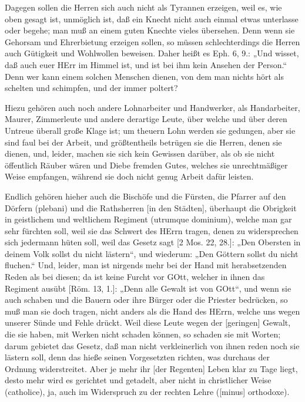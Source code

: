 Dagegen sollen die Herren sich auch nicht als Tyrannen erzeigen, weil es, wie oben gesagt ist, unmöglich ist, daß ein Knecht nicht auch einmal etwas unterlasse oder begehe; man muß an einem guten Knechte vieles übersehen. Denn wenn sie Gehorsam und Ehrerbietung erzeigen sollen, so müssen schlechterdings die Herren auch Gütigkeit und Wohlwollen beweisen. Daher heißt es Eph. 6, 9.: „Und wisset, daß auch euer HErr im Himmel ist, und ist bei ihm kein Ansehen der Person.“ Denn wer kann einem solchen Menschen dienen, von dem man nichts hört als schelten und schimpfen, und der immer poltert?

Hiezu gehören auch noch andere Lohnarbeiter
und Handwerker, als Handarbeiter, Maurer, Zimmerleute und andere derartige Leute, über welche und über deren Untreue überall große Klage ist; um theuern Lohn werden sie gedungen, aber sie sind faul bei der Arbeit, und größtentheils betrügen sie die Herren, denen sie dienen, und, leider, machen sie sich kein Gewissen darüber, als ob sie nicht öffentlich Räuber wären und Diebe fremden Gutes, welches sie unrechtmäßiger Weise empfangen, während sie doch nicht genug Arbeit dafür leisten.

Endlich gehören hieher auch die Bischöfe und die Fürsten, die Pfarrer auf den Dörfern (plebani) und die Rathsherren [in den Städten], überhaupt die Obrigkeit in geistlichem und weltlichem Regiment (utrumque dominium), welche man gar sehr fürchten soll, weil sie das Schwert des HErrn tragen, denen zu widersprechen sich jedermann hüten soll, weil das Gesetz sagt [2 Mos. 22, 28.]: „Den Obersten in deinem Volk sollst du nicht lästern“, und wiederum: „Den Göttern sollst du nicht fluchen.“ Und, leider, man ist nirgends mehr bei der Hand mit herabsetzenden Reden als bei diesen; da ist keine Furcht vor GOtt, welcher in ihnen das Regiment ausübt [Röm. 13, 1.]: „Denn alle Gewalt ist von GOtt“, und wenn sie auch schaben und die Bauern oder ihre Bürger oder die Priester bedrücken, so muß man sie doch tragen, nicht anders als die Hand des HErrn, welche uns wegen unserer Sünde und Fehle drückt. Weil diese Leute wegen der [geringen] Gewalt, die sie haben, mit Werken nicht schaden können, so schaden sie mit Worten; darum gebietet das Gesetz, daß man nicht verkleinerlich von ihnen reden noch sie lästern soll, denn das hieße seinen Vorgesetzten richten, was durchaus der Ordnung widerstreitet. Aber je mehr ihr [der Regenten] Leben klar zu Tage liegt, desto mehr wird es gerichtet und getadelt, aber nicht in christlicher Weise (catholice), ja, auch im Widerspruch zu der rechten Lehre ([minus] orthodoxe).

